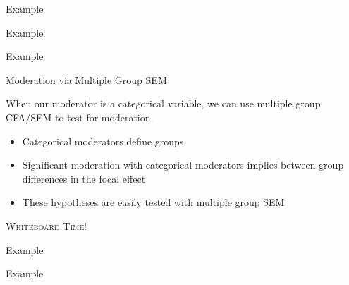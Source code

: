 \documentclass{beamer}
\newcommand{\va}[0]{\vspace{12pt}}
\newcommand{\vb}[0]{\vspace{6pt}}
\begin{document}
\begin{frame}[shrink = 10]{Example}



\end{frame}



\begin{frame}[shrink = 10]{Example}



\end{frame}



\begin{frame}[shrink = 10]{Example}



\end{frame}




\begin{frame}{Moderation via Multiple Group SEM}
  
  When our moderator is a categorical variable, we can use multiple
  group CFA/SEM to test for moderation.
  \va
  \begin{itemize}
    \item Categorical moderators define groups
      \vb
    \item Significant moderation with categorical moderators implies
      between-group differences in the focal effect
      \vb
    \item These hypotheses are easily tested with multiple group SEM
  \end{itemize}
  \va
  \begin{center}\textsc{Whiteboard Time!}\end{center}
  
\end{frame}



\begin{frame}[allowframebreaks]{Example}



\end{frame}



\begin{frame}[shrink = 10]{Example}
  


\end{frame}
\end{document}
